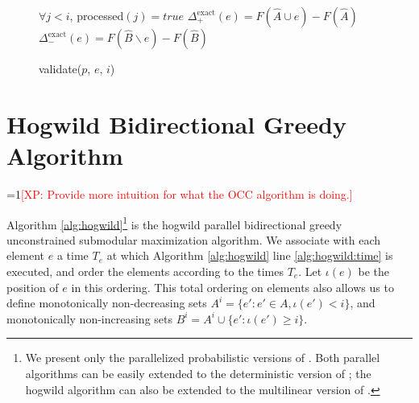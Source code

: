 \documentclass{article} %
\newcommand{\Comments}{1}
\newcommand{\note}[2]{\ifnum\Comments=1\textcolor{#1}{#2}\fi}
\newcommand{\xinghao}[1]{\note{red}{[XP: #1]}}
\begin{document}
\begin{figure}[h]
\begin{multicols}{2}
\begin{minipage}{0.49\textwidth}
\begin{algorithm}[H]
\DontPrintSemicolon
\caption{validate($p$, $e$, $i$)}
\label{alg:occvalidate}
  \WaitUntil $\forall j < i$, processed$(j) = true$\;
  $\Delta_+^{\text{exact}}(e) = F(\hat{A} \cup e) - F(\hat{A})$\;\label{alg:occvalidate:deltaplus}
  $\Delta_-^{\text{exact}}(e) = F(\hat{B} \backslash e) - F(\hat{B})$\;\label{alg:occvalidate:deltaminus}
\end{algorithm}


  \label{fig:submax}
    \end{minipage}
    
    
    
  \end{multicols}
\end{figure}








\section{Hogwild Bidirectional Greedy Algorithm}
\xinghao{Provide more intuition for what the OCC algorithm is doing.}

Algorithm \ref{alg:hogwild}\footnote{We present only the parallelized probabilistic versions of \cite{buchbinder2012}. Both parallel algorithms can be easily extended to the deterministic version of \cite{buchbinder2012}; the hogwild algorithm can also be extended to the multilinear version of \cite{buchbinder2012}.} is the hogwild parallel bidirectional greedy unconstrained submodular maximization algorithm.
We associate with each element $e$ a time $T_e$ at which Algorithm \ref{alg:hogwild} line \ref{alg:hogwild:time} is executed, and order the elements according to the times $T_e$.
Let $\iota(e)$ be the position of $e$ in this ordering.
This total ordering on elements also allows us to define monotonically non-decreasing sets $A^i = \{e' : e' \in A, \iota(e') < i\}$, and monotonically non-increasing sets $B^i = A^i \cup \{e': \iota(e') \geq i\}$.
\end{document}
